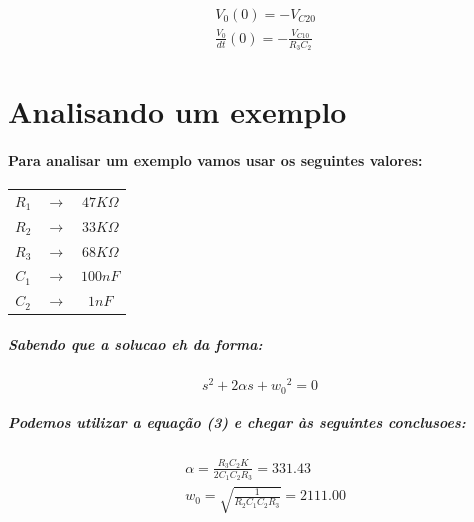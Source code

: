 \documentclass[12pt,twoside, a4paper, twocolumn]{article}
\begin{document}
{\begin{equation}
    \begin{aligned}
         & V_0(0)  = - V_{C20}                          \\
         & \frac{V_0}{dt}(0) = -\frac{V_{C10}}{R_3 C_2}
    \end{aligned}
\end{equation}

\section{Analisando um exemplo}

\paragraph*{Para analisar um exemplo vamos usar os seguintes valores:}

\begin{center}
    \begin{tabular}{ |ccc| }
        \hline
        $R_1$ & $\rightarrow$ & $47K\varOmega$ \\
        $R_2$ & $\rightarrow$ & $33K\varOmega$ \\
        $R_3$ & $\rightarrow$ & $68K\varOmega$ \\
        $C_1$ & $\rightarrow$ & $100nF$        \\
        $C_2$ & $\rightarrow$ & $1nF$          \\

        \hline
    \end{tabular}
\end{center}

\subparagraph*{Sabendo que a solucao eh da forma:}

\begin{equation*}
    s^2 + 2 \alpha s + w_0{^2} = 0
\end{equation*}

\subparagraph*{Podemos utilizar a equação (3) e chegar às seguintes conclusoes:}

\begin{equation}
    \begin{aligned}
         & \alpha = \frac{R_3 C_2 K }{2 C_1 C_2 R_3} = 331.43 \\
         & w_0 = \sqrt{ \frac{1}{R_2 C_1 C_2 R_3}}= 2111.00   \\
    \end{aligned}
\end{equation}

}
\end{document}
